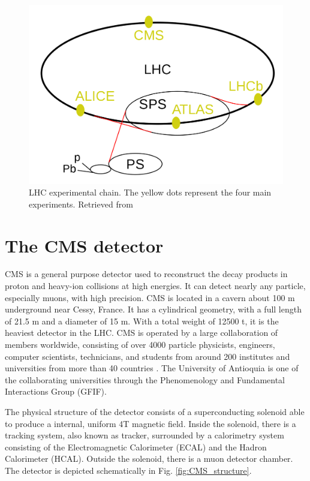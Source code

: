 \begin{figure}[htp!]
	\centering
	\includegraphics[scale=0.3]{MainContent/Figs/LHC.png}
	\caption{LHC experimental chain. The yellow dots represent the four main experiments. Retrieved from }
	\label{fig:LHC}
\end{figure}

\section{The CMS detector}

CMS is a general purpose detector used to reconstruct the decay products in proton and heavy-ion collisions at high energies. It can detect nearly any particle, especially muons, with high precision. CMS is located in a cavern about 100 m underground near Cessy, France. It has a cylindrical geometry, with a full length of 21.5 m and a diameter of 15 m. With a total weight of 12500 t, it is the heaviest detector in the LHC. CMS is operated by a large collaboration of members worldwide, consisting of over 4000 particle physicists, engineers, computer scientists, technicians, and students from around 200 institutes and universities from more than 40 countries \cite{cms_collab}. The University of Antioquia is one of the collaborating universities through the Phenomenology and Fundamental Interactions Group (GFIF).

The physical structure of the detector consists of a superconducting solenoid able to produce a internal, uniform 4T magnetic field. Inside the solenoid, there is a tracking system, also known as tracker, surrounded by a calorimetry system consisting of the Electromagnetic Calorimeter (ECAL) and the Hadron Calorimeter (HCAL). Outside the solenoid, there is a muon detector chamber. The detector is depicted schematically in Fig. \ref{fig:CMS_structure}.

